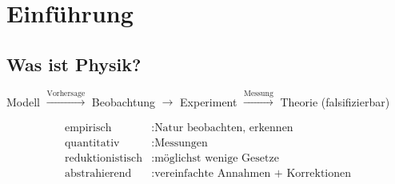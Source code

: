 \documentclass[a4paper,12pt]{article}
\begin{document}
\section{Einführung}

\subsection{Was ist Physik?}
\begin{center}
        Modell $\xrightarrow{\text{Vorhersage}} $ Beobachtung $\rightarrow $ Experiment $\xrightarrow{\text{Messung}} $ Theorie (falsifizierbar)
\end{center}
\begin{align*}
        \text{empirisch}&:\text{Natur beobachten, erkennen}\\
        \text{quantitativ}&:\text{Messungen}\\
        \text{reduktionistisch}&:\text{möglichst wenige Gesetze}\\
        \text{abstrahierend}&:\text{vereinfachte Annahmen + Korrektionen}
\end{align*}
\end{document}
